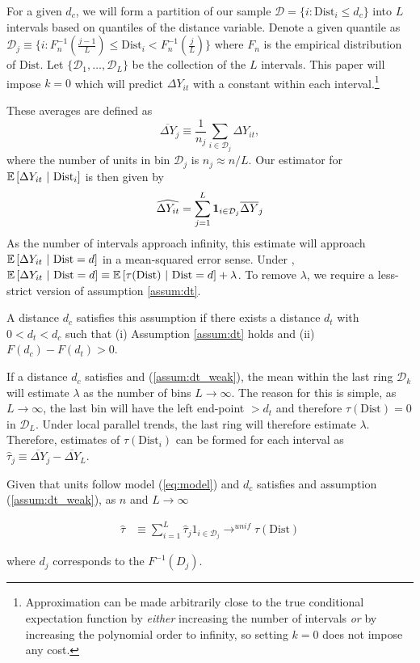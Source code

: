 \documentclass[10pt]{article}
\newcommand{\dist}{\text{Dist}}
\begin{document}
For a given $d_c$, we will form a partition of our sample $\mathcal{D} = \{ i : \dist_i \leq d_c \}$ into $L$ intervals based on quantiles of the distance variable. Denote a given quantile as $\mathcal{D}_j \equiv\{ i : F_n^{-1}(\frac{j-1}{L}) \leq \dist_i < F_n^{-1}(\frac{j}{L}) \}$ where $F_n$ is the empirical distribution of $\dist$. Let $\{ \mathcal{D}_1, \dots, \mathcal{D}_L \}$ be the collection of the $L$ intervals. This paper will impose $k = 0$ which will predict $\Delta Y_{it}$ with a constant within each interval.\footnote{Approximation can be made arbitrarily close to the true conditional expectation function by \emph{either} increasing the number of intervals \emph{or} by increasing the polynomial order to infinity, so setting $k = 0$ does not impose any cost.} 

These averages are defined as 
\[
    \overline{\Delta Y}_j \equiv \frac{1}{n_j} \sum_{i \in \mathcal{D}_j} \Delta Y_{it},
\]
where the number of units in bin $\mathcal{D}_j$ is $n_j \approx n/L$. Our estimator for $\condexpec{\Delta Y_{it}}{\dist_i}$ is then given by
\[
    \widehat{\Delta Y_{it}} = \sum_{j = 1}^{L} \mathbf{1}_{i \in \mathcal{D}_j} \overline{\Delta Y}_j
\]
As the number of intervals approach infinity, this estimate will approach $\condexpec{\Delta Y_{it}}{\dist = d}$ in a mean-squared error sense. Under , $\condexpec{\Delta Y_{it}}{\dist = d} \equiv \condexpec{\tau(\dist)}{\dist = d} + \lambda$. To remove $\lambda$, we require a less-strict version of assumption \ref{assum:dt}.

\begin{assumption}[$d_t$ is within $d_c$]\label{assum:dt_weak}
    A distance $d_c$ satisfies this assumption if there exists a distance $d_t$ with $0 < d_t < d_c$ such that (i) Assumption \ref{assum:dt} holds and (ii) $F(d_c) - F(d_t) > 0$.
\end{assumption}

If a distance $d_c$ satisfies  and (\ref{assum:dt_weak}), the mean within the last ring $\mathcal{D}_k$ will estimate $\lambda$ as the number of bins $L \to \infty$. The reason for this is simple, as $L \to \infty$, the last bin will have the left end-point $> d_t$ and therefore $\tau(\dist) = 0$ in $\mathcal{D}_L$. Under local parallel trends, the last ring will therefore estimate $\lambda$. Therefore, estimates of $\tau(\dist_i)$ can be formed for each interval as $\hat{\tau}_j \equiv \overline{\Delta Y}_j - \overline{\Delta Y}_L$. 

\begin{proposition}\label{prop:np_identification}  
    Given that units follow model (\ref{eq:model}) and $d_c$ satisfies  and assumption (\ref{assum:dt_weak}), as $n$ and $L \to \infty$ 

    \begin{align*}
        \hat{\tau} &\equiv \sum_{i=1}^L \hat{\tau}_j 1_{i \in \mathcal{D}_j} \to^{unif} \tau(\dist)
    \end{align*}

    where $d_j$ corresponds to the $F^{-1}(D_j)$.
\end{proposition}
\end{document}
